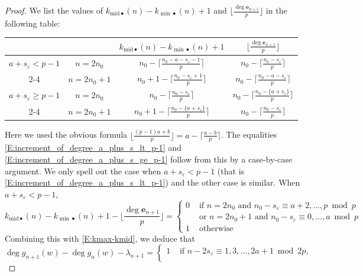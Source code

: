 \begin{proof}
    We list the values of $k_{{{\mathrm{mid}}}\bullet}(n)-k_{{\min}\bullet}(n)+1$ and $\lfloor\frac {\deg {\mathbf{e}}_{n+1}}p\rfloor$ in the following table:
    \begin{center}
    \begin{tabular}{|c|c|c|c|}
    \hline
     & &$k_{{\mathrm{mid}}\bullet}(n)-k_{{\min} \bullet}(n)+1$ & $\lfloor\frac{\deg {\mathbf{e}}_{n+1}}p\rfloor$
    \\
    \hline
    $a+s_\varepsilon < p-1$ & $n=2n_0$ &  $n_0-\lceil \frac{n_0-a-s_\varepsilon-1}{p}\rceil$ & $n_0-\lceil \frac{n_0-s_\varepsilon}p\rceil$
    \\
    \cline{2-4}
    & $n=2n_0+1$ & $n_0+1-\lceil\frac{n_0-s_\varepsilon+1}{p}\rceil$ &$n_0-\lceil \frac{n_0-a-s_\varepsilon}p\rceil$
    \\
    \hline
    $a+s_\varepsilon \geq p-1$ & $n=2n_0$ & $n_0-\lceil \frac{n_0-s_\varepsilon}{p} \rceil$  &  $n_0-\lceil \frac{n_0-\{a+s_\varepsilon\}}p\rceil$
    \\
    \cline{2-4} & $n=2n_0+1$ & $ n_0+1-\lceil \frac{n_0-\{a+s_\varepsilon\}}{p} \rceil$& $n_0-\lceil \frac{n_0-s_\varepsilon}p\rceil$
    \\
    \hline
    \end{tabular}
    \end{center}
    Here we used the obvious formula $\lfloor \frac{(p-1)a+b}p\rfloor = a - \lceil \frac{a-b}p\rceil$.
    The equalities \eqref{E:increment_of_degree_a_plus_s_lt_p-1} and \eqref{E:increment_of_degree_a_plus_s_ge_p-1} follow from this by a case-by-case argument. We only spell out the case when $a+s_\varepsilon<p-1$ (that is \eqref{E:increment_of_degree_a_plus_s_lt_p-1}) and the other case is similar.
    When $a+s_\varepsilon<p-1$,
    $$
    k_{{\mathrm{mid}}\bullet}(n) - k_{{\min}\bullet}(n)+1 - \Big\lfloor \frac{\deg {\mathbf{e}}_{n+1}}p\Big \rfloor=
    \begin{cases}
    0 & \textrm{ if } n = 2n_0 \textrm{ and } n_0  -s_\varepsilon \equiv a+2, \dots, p \bmod p\\
    & \textrm{ or } n = 2n_0+1 \textrm{ and } n_0 -s_\varepsilon \equiv 0, \dots, a \bmod p\\
    1 & \textrm{ otherwise}
    \end{cases}
    $$
    Combining this with \eqref{E:kmax-kmid}, we deduce that
    $$
    \deg g_{n+1}(w) - \deg g_n(w) - \lambda_{n+1} = \begin{cases}
    1 & \textrm{ if } n - 2s_\varepsilon \equiv 1, 3, \dots, 2a+1 \bmod {2p},
    \\

\end{cases}$$
\end{proof}
